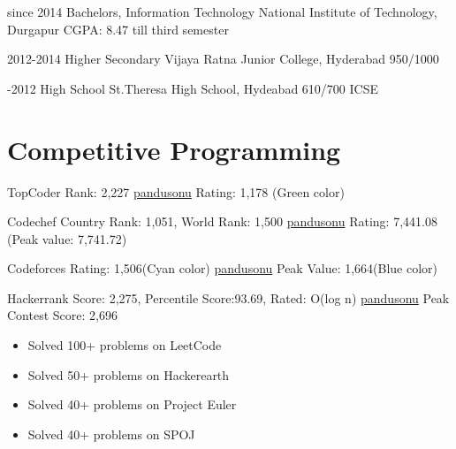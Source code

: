 \documentclass[]{friggeri-cv-a4}
\begin{document}
\begin{entrylist}

\entry
{since 2014}
{Bachelors, {\normalfont Information Technology}}
{National Institute of Technology, Durgapur}
{CGPA: 8.47 till third semester}
{}

\entry
{2012-2014}
{Higher Secondary}
{Vijaya Ratna Junior College, Hyderabad}
{950/1000}
{}

\entry
{-2012}
{High School}
{St.Theresa High School, Hydeabad}
{610/700 ICSE}
{}

\end{entrylist}


\section{\normalfont Competitive Programming}

\begin{entrylist}

\entry
{TopCoder}
{Rank: 2,227}
{\href{https://www.topcoder.com/members/pandusonu/}{pandusonu}}
{Rating: 1,178 (Green color)}

\entry
{Codechef}
{Country Rank: 1,051, World Rank: 1,500}
{\href{http://www.codechef.com/users/pandusonu}{pandusonu}}
{Rating: 7,441.08 (Peak value: 7,741.72)}

\entry
{Codeforces}
{Rating: 1,506(Cyan color)}
{\href{http://codeforces.com/profile/pandusonu}{pandusonu}}
{Peak Value: 1,664(Blue color)}

\entry
{Hackerrank}
{Score: 2,275, Percentile Score:93.69, Rated: O(log n)}
{\href{https://www.hackerrank.com/pandusonu}{pandusonu}}
{Peak Contest Score: 2,696}

\end{entrylist}
\begin{itemize}
\item Solved 100+ problems on LeetCode
\item Solved 50+ problems on Hackerearth
\item Solved 40+ problems on Project Euler
\item Solved 40+ problems on SPOJ
\end{itemize}

\end{document}
